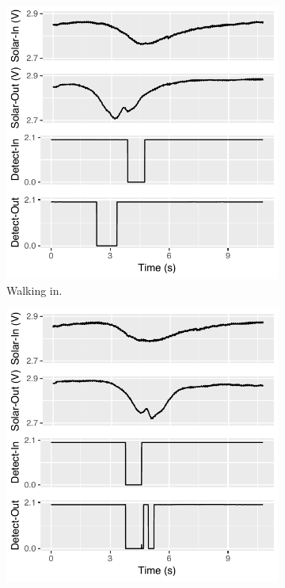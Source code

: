 \begin{figure}[t]
	\centering
	\begin{subfigure}[b]{0.5\textwidth}
		\centering
		\includegraphics[width=\columnwidth]{figs/tracesin.pdf}
		\caption{Walking in.}
		\label{fig:tracesin}
	\end{subfigure}%
	\begin{subfigure}[b]{0.5\textwidth}
		\centering
		\includegraphics[width=\columnwidth]{figs/tracesout.pdf}

\end{subfigure}
\end{figure}
